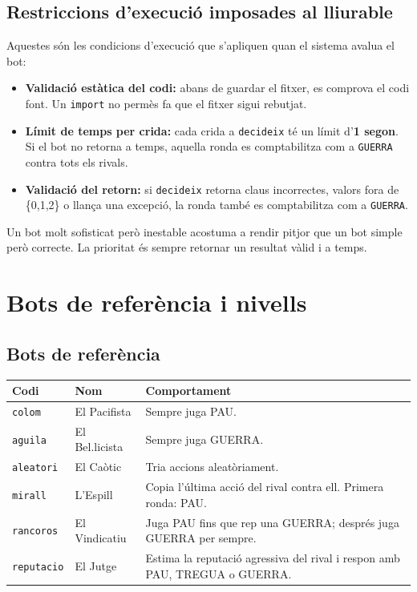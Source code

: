 \documentclass[12pt,a4paper]{report}
\begin{document}
\section{Restriccions d'execució imposades al lliurable}

Aquestes són les condicions d'execució que s'apliquen quan el sistema avalua el bot:

\begin{itemize}
  \item \textbf{Validació estàtica del codi:} abans de guardar el fitxer, es
  comprova el codi font. Un \texttt{import} no permès fa que el fitxer sigui
  rebutjat.
  \item \textbf{Límit de temps per crida:} cada crida a \texttt{decideix} té un
  límit d'\textbf{1 segon}. Si el bot no retorna a temps, aquella ronda es
  comptabilitza com a \texttt{GUERRA} contra tots els rivals.
  \item \textbf{Validació del retorn:} si \texttt{decideix} retorna claus
  incorrectes, valors fora de \{0,1,2\} o llança una excepció, la ronda també
  es comptabilitza com a \texttt{GUERRA}.
\end{itemize}

\begin{tcolorbox}[colback=softyellow,colframe=upcblue,title=Conseqüència pràctica]
Un bot molt sofisticat però inestable acostuma a rendir pitjor que un bot simple
però correcte. La prioritat és sempre retornar un resultat vàlid i a temps.
\end{tcolorbox}

\chapter{Bots de referència i nivells}

\section{Bots de referència}

\begin{center}
\begin{tabularx}{\textwidth}{>{\ttfamily}l l Y}
\toprule
Codi & Nom & Comportament \\
\midrule
\texttt{colom} & El Pacifista & Sempre juga PAU. \\
\texttt{aguila} & El Bel.licista & Sempre juga GUERRA. \\
\texttt{aleatori} & El Caòtic & Tria accions aleatòriament. \\
\texttt{mirall} & L'Espill & Copia l'última acció del rival contra ell. Primera ronda: PAU. \\
\texttt{rancoros} & El Vindicatiu & Juga PAU fins que rep una GUERRA; després juga GUERRA per sempre. \\
\texttt{reputacio} & El Jutge & Estima la reputació agressiva del rival i respon amb PAU, TREGUA o GUERRA. \\
\bottomrule
\end{tabularx}
\end{center}
\end{document}
